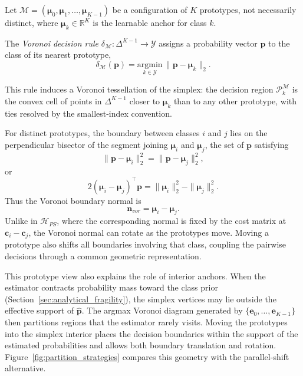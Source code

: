 Let $\mathcal{M} = (\boldsymbol{\mu}_0, \boldsymbol{\mu}_1, \dots, \boldsymbol{\mu}_{K-1})$ be a configuration of $K$ prototypes, not necessarily distinct, where $\boldsymbol{\mu}_k \in \mathbb{R}^K$ is the learnable anchor for class $k$.

\begin{definition}\label{def:voronoi_rule}
    The \emph{Voronoi decision rule} $\delta_{\mathcal{M}}: \Delta^{K-1} \to \mathcal{Y}$ assigns a probability vector $\mathbf{p}$ to the class of its nearest prototype,
    \begin{equation}\label{eq:voronoi_rule}
        \delta_{\mathcal{M}}(\mathbf{p}) = \underset{k \in \mathcal{Y}}{\mathrm{argmin}} \, \| \mathbf{p} - \boldsymbol{\mu}_k \|_2.
    \end{equation}
\end{definition}

This rule induces a Voronoi tessellation of the simplex: the decision region $\mathcal{P}_k^{\mathcal{M}}$ is the convex cell of points in $\Delta^{K-1}$ closer to $\boldsymbol{\mu}_k$ than to any other prototype, with ties resolved by the smallest-index convention.

For distinct prototypes, the boundary between classes $i$ and $j$ lies on the perpendicular bisector of the segment joining $\boldsymbol{\mu}_i$ and $\boldsymbol{\mu}_j$, the set of $\mathbf{p}$ satisfying
\begin{equation}
    \|\mathbf{p}-\boldsymbol{\mu}_i\|_2^2 = \|\mathbf{p}-\boldsymbol{\mu}_j\|_2^2,
\end{equation}
or
\begin{equation}
    2(\boldsymbol{\mu}_i-\boldsymbol{\mu}_j)^\top \mathbf{p} = \|\boldsymbol{\mu}_i\|_2^2-\|\boldsymbol{\mu}_j\|_2^2.
\end{equation}
Thus the Voronoi boundary normal is
\begin{equation}
    \mathbf{n}_{vor} = \boldsymbol{\mu}_i - \boldsymbol{\mu}_j.
\end{equation}
Unlike in $\mathcal{H}_{PS}$, where the corresponding normal is fixed by the cost matrix at $\mathbf{c}_i-\mathbf{c}_j$, the Voronoi normal can rotate as the prototypes move. Moving a prototype also shifts all boundaries involving that class, coupling the pairwise decisions through a common geometric representation.

This prototype view also explains the role of interior anchors. When the estimator contracts probability mass toward the class prior (Section~\ref{sec:analytical_fragility}), the simplex vertices may lie outside the effective support of $\hat{\mathbf{p}}$. The argmax Voronoi diagram generated by $\{\mathbf{e}_0,\ldots,\mathbf{e}_{K-1}\}$ then partitions regions that the estimator rarely visits. Moving the prototypes into the simplex interior places the decision boundaries within the support of the estimated probabilities and allows both boundary translation and rotation. Figure~\ref{fig:partition_strategies} compares this geometry with the parallel-shift alternative.


